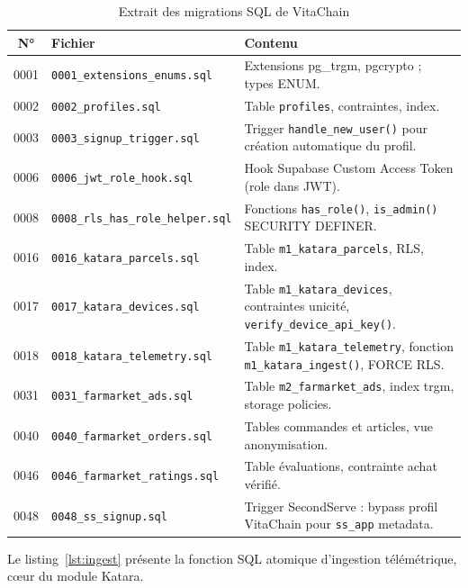 \documentclass[12pt,a4paper]{report}
\newcommand{\code}[1]{\texttt{\small #1}}
\begin{document}
\begin{table}[H]
  \centering
  \caption{Extrait des migrations SQL de VitaChain}
  \label{tab:migrations}
  \small
  \begin{tabularx}{\linewidth}{clX}
    \toprule
    \textbf{N°} & \textbf{Fichier} & \textbf{Contenu} \\
    \midrule
    0001 & \code{0001\_extensions\_enums.sql}
         & Extensions pg\_trgm, pgcrypto ; types ENUM. \\
    0002 & \code{0002\_profiles.sql}
         & Table \code{profiles}, contraintes, index. \\
    0003 & \code{0003\_signup\_trigger.sql}
         & Trigger \code{handle\_new\_user()} pour création automatique
           du profil. \\
    0006 & \code{0006\_jwt\_role\_hook.sql}
         & Hook Supabase Custom Access Token (role dans JWT). \\
    0008 & \code{0008\_rls\_has\_role\_helper.sql}
         & Fonctions \code{has\_role()}, \code{is\_admin()} SECURITY
           DEFINER. \\
    0016 & \code{0016\_katara\_parcels.sql}
         & Table \code{m1\_katara\_parcels}, RLS, index. \\
    0017 & \code{0017\_katara\_devices.sql}
         & Table \code{m1\_katara\_devices}, contraintes unicité,
           \code{verify\_device\_api\_key()}. \\
    0018 & \code{0018\_katara\_telemetry.sql}
         & Table \code{m1\_katara\_telemetry}, fonction
           \code{m1\_katara\_ingest()}, FORCE RLS. \\
    0031 & \code{0031\_farmarket\_ads.sql}
         & Table \code{m2\_farmarket\_ads}, index trgm, storage policies. \\
    0040 & \code{0040\_farmarket\_orders.sql}
         & Tables commandes et articles, vue anonymisation. \\
    0046 & \code{0046\_farmarket\_ratings.sql}
         & Table évaluations, contrainte achat vérifié. \\
    0048 & \code{0048\_ss\_signup.sql}
         & Trigger SecondServe : bypass profil VitaChain pour
           \code{ss\_app} metadata. \\
    \bottomrule
  \end{tabularx}
\end{table}

Le listing~\ref{lst:ingest} présente la fonction SQL atomique d'ingestion
télémétrique, cœur du module Katara.
\end{document}
